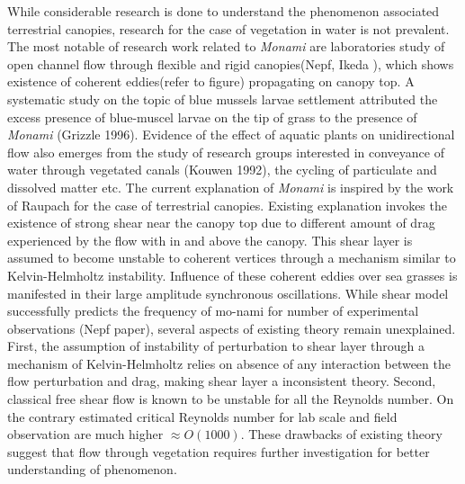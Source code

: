 \documentclass[12pt]{report}   %
\begin{document}
\newline
While considerable research is done to understand the phenomenon associated terrestrial canopies, research for the case of vegetation in water is not prevalent. The most notable of research work related to \textit{Monami} are laboratories study of open channel flow through flexible and rigid canopies(Nepf, Ikeda ), which shows existence of coherent eddies(refer to figure) propagating on canopy top. A systematic study on the topic of blue mussels larvae settlement attributed the excess presence of blue-muscel larvae on the tip of grass to the presence of \textit{Monami} (Grizzle 1996). Evidence of the effect of aquatic plants on unidirectional flow also emerges from the study of research groups interested in conveyance of water through vegetated canals (Kouwen 1992), the cycling of particulate and dissolved matter etc. 
\newline The current explanation of \textit{Monami} is inspired by the work of Raupach for the case of terrestrial canopies. Existing explanation invokes the existence of strong shear near the canopy top due to different amount of drag experienced by the flow with in and above the canopy. This shear layer is assumed to become unstable to coherent vertices through a mechanism similar to 
Kelvin-Helmholtz instability. Influence of these coherent eddies over sea grasses is manifested in their large amplitude synchronous oscillations.
While shear model successfully predicts the frequency of mo-nami for number of experimental observations (Nepf paper), several aspects of existing theory remain unexplained. First, the assumption of instability of perturbation to shear layer through a mechanism of Kelvin-Helmholtz relies on absence of any interaction between the flow perturbation and drag, making shear layer a inconsistent theory. Second, classical free shear flow is known to be unstable for all the Reynolds number. On the contrary estimated critical Reynolds number for lab scale and field observation are much higher $\approx O(1000)$. These drawbacks of existing theory suggest that flow through vegetation requires further investigation for better understanding of phenomenon.
\end{document}
